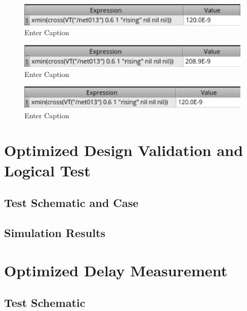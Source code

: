 \documentclass[12pt]{article}
\begin{document}
\begin{figure}[H]
    \centering
    \includegraphics[width=0.5\linewidth]{writeup//figures/wbuf3.png}
    \caption{Enter Caption}
\end{figure}


\begin{figure}[H]
    \centering
    \includegraphics[width=0.5\linewidth]{writeup//figures/wmux4.png}
    \caption{Enter Caption}
\end{figure}

\begin{figure}
    \centering
    \includegraphics[width=0.5\linewidth]{writeup//figures/wbuf4.png}
    \caption{Enter Caption}
\end{figure}



\newpage

\section{Optimized Design Validation and Logical Test}
\subsection{Test Schematic and Case}



\newpage

\subsection{Simulation Results}



\newpage

\section{Optimized Delay Measurement}
\subsection{Test Schematic}
\end{document}
